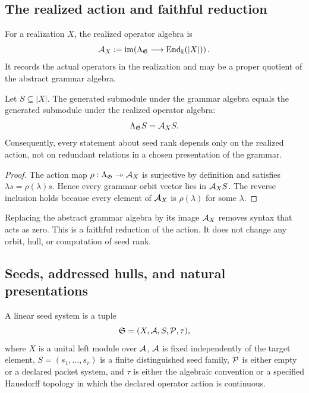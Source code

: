 \subsection{The realized action and faithful reduction}
\begin{definition}
\label{def:realized-algebra}
For a realization $X$, the realized operator algebra is
\[
\mathcal A_X:=\operatorname{im}\!\left(\Lambda_{\mathfrak G}\longrightarrow\operatorname{End}_{\Bbbk}(|X|)\right).
\]
It records the actual operators in the realization and may be a proper quotient of the abstract grammar algebra.
\end{definition}

\begin{proposition}
\label{prop:action-factorization}
Let $S\subseteq |X|$.  The generated submodule under the grammar algebra equals the generated submodule under the realized operator algebra:
\[
\Lambda_{\mathfrak G}S=\mathcal A_XS.
\]
Consequently, every statement about seed rank depends only on the realized action, not on redundant relations in a chosen presentation of the grammar.
\end{proposition}

\begin{proof}
The action map $\rho:\Lambda_{\mathfrak G}\twoheadrightarrow\mathcal A_X$ is surjective by definition and satisfies $\lambda s=\rho(\lambda)s$.  Hence every grammar orbit vector lies in $\mathcal A_XS$.  The reverse inclusion holds because every element of $\mathcal A_X$ is $\rho(\lambda)$ for some $\lambda$.
\end{proof}

\begin{keyidea}
Replacing the abstract grammar algebra by its image \(\mathcal A_X\) removes syntax that acts as zero.  This is a faithful reduction of the action.  It does not change any orbit, hull, or computation of seed rank.
\end{keyidea}


\subsection{Seeds, addressed hulls, and natural presentations}
\begin{definition}
\label{def:seed-system}
A linear seed system is a tuple
\[
\mathfrak S=(X,\mathcal A,S,\mathcal P,\tau),
\]
where $X$ is a unital left module over $\mathcal A$, $\mathcal A$ is fixed independently of the target element, $S=(s_1,\ldots,s_r)$ is a finite distinguished seed family, $\mathcal P$ is either empty or a declared packet system, and $\tau$ is either the algebraic convention or a specified Hausdorff topology in which the declared operator action is continuous.
\end{definition}

